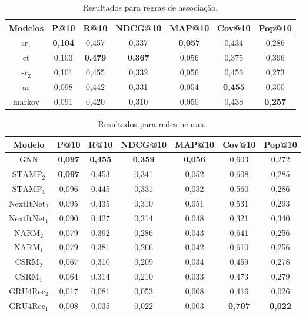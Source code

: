 \begin{table}[htbp]
  \centering
  \begin{tabular}{|c|c|c|c|c|c|c|}
    \hline
     Modelos & P@10 & R@10 & NDCG@10 & MAP@10 & Cov@10 & Pop@10 \\
    \hline
    $\text{sr}_1$ & \textbf{0,104} & 0,457 & 0,337 & \textbf{0,057} & 0,434 & 0,286 \\
    \hline
    ct & 0,103 & \textbf{0,479} & \textbf{0,367} & 0,056 & 0,375 & 0,396 \\
    \hline
    $\text{sr}_2$ & 0,101 & 0,455 & 0,332 & 0,056 & 0,453 & 0,273 \\
    \hline
     ar & 0,098 & 0,442 & 0,331 & 0,054 & \textbf{0,455} & 0,300 \\
    \hline
     markov & 0,091 & 0,420 & 0,310 & 0,050 & 0,438 & \textbf{0,257} \\
    \hline
  \end{tabular}
  \caption{Resultados para regras de associação.}
  \label{tab_model_results}
\end{table}




\begin{table}[htbp]
  \centering
  \begin{tabular}{|c|c|c|c|c|c|c|}
    \hline
    Modelo & P@10 & R@10 & NDCG@10 & MAP@10 & Cov@10 & Pop@10 \\
    \hline
    GNN & \textbf{0,097} & \textbf{0,455} & \textbf{0,359} & \textbf{0,056} & 0,603 & 0,272 \\
    \hline
    $\text{STAMP}_2$ & \textbf{0,097} & 0,453 & 0,341 & 0,052 & 0,608 & 0,285 \\
    \hline
    $\text{STAMP}_1$ & 0,096 & 0,445 & 0,331 & 0,052 & 0,560 & 0,286 \\
    \hline
    $\text{NextItNet}_2$ & 0,095 & 0,435 & 0,310 & 0,051 & 0,531 & 0,293 \\
    \hline
    $\text{NextItNet}_1$ & 0,090 & 0,427 & 0,314 & 0,048 & 0,321 & 0,340 \\
    \hline
    $\text{NARM}_2$ & 0,079 & 0,392 & 0,286 & 0,043 & 0,641 & 0,256 \\
    \hline
    $\text{NARM}_1$ & 0,079 & 0,381 & 0,266 & 0,042 & 0,610 & 0,256 \\
    \hline
    $\text{CSRM}_2$ & 0,067 & 0,310 & 0,209 & 0,034 & 0,459 & 0,278 \\
    \hline
    $\text{CSRM}_1$ & 0,064 & 0,314 & 0,210 & 0,033 & 0,473 & 0,279 \\
    \hline
    $\text{GRU4Rec}_2$ & 0,017 & 0,081 & 0,053 & 0,008 & 0,416 & 0,026 \\
    \hline
    $\text{GRU4Rec}_1$ & 0,008 & 0,035 & 0,022 & 0,003 & \textbf{0,707} & \textbf{0,022} \\
    \hline
  \end{tabular}
  \caption{Resultados para redes neurais.}
\end{table}

